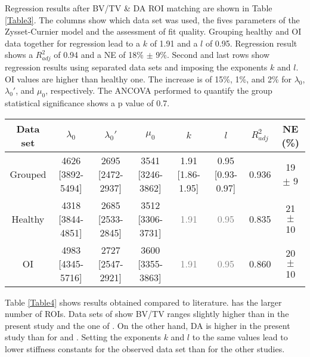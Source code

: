 \documentclass[a4paper,fleqn]{DC_ArtStyle}
\begin{document}
Regression results after BV/TV \& DA ROI matching are shown in Table \ref{Table3}. The columns show which data set was used, the fives parameters of the Zysset-Curnier model and the assessment of fit quality. Grouping healthy and OI data together for regression lead to a $k$ of 1.91 and a $l$ of 0.95. Regression result shows a $R^2_{adj}$ of 0.94 and a NE of 18\% $\pm$ 9\%. Second and last rows show regression results using separated data sets and imposing the exponents $k$ and $l$. OI values are higher than healthy one. The increase is of 15\%, 1\%, and 2\% for $\lambda_0$, $\lambda_0'$, and $\mu_0$, respectively. The ANCOVA performed to quantify the group statistical significance shows a p value of 0.7.\\

\begin{table*}[b]
	\caption{Constants obtained with BV/TV and DA matched data sets. Comparison is performed between grouped (N ROIs = 166) and separated data sets (N ROIs = 83). Values are presented as value [95\% CI] or mean $\pm$ standard deviation. Values in gray were imposed in the regression.}
	\label{Table3}
	\begin{tabular}{cccccccc}
		\toprule
		Data set & $\lambda_0$ & $\lambda_0'$ & $\mu_0$ & $k$ & $l$ & $R^2_{adj}$ & NE (\%) \\
		\midrule
		Grouped & 4626 [3892-5494] & 2695 [2472-2937] & 3541 [3246-3862] & 1.91 [1.86-1.95] & 0.95 [0.93-0.97] & 0.936 & 19 $\pm$ 9\\
		
		Healthy & 4318 [3844-4851] & 2685 [2533-2845] & 3512 [3306-3731] & \textcolor{gray}{1.91} & \textcolor{gray}{0.95} & 0.835 & 21 $\pm$ 10\\
		
		OI & 4983 [4345-5716] & 2727 [2547-2921] & 3600 [3355-3863] & \textcolor{gray}{1.91} & \textcolor{gray}{0.95} & 0.860 & 20 $\pm$ 10\\
		\bottomrule
	\end{tabular}
\end{table*}

Table \ref{Table4} shows results obtained compared to literature. \citeauthor{Gross2013} \cite{Gross2013} has the larger number of ROIs. Data sets of \citeauthor{Panyasantisuk2015} \cite{Panyasantisuk2015} show BV/TV ranges slightly higher than in the present study and the one of \citeauthor{Gross2013} \cite{Gross2013}. On the other hand, DA is higher in the present study than for \citeauthor{Panyasantisuk2015} \cite{Panyasantisuk2015} and \citeauthor{Gross2013} \cite{Gross2013}. Setting the exponents $k$ and $l$ to the same values lead to lower stiffness constants for the observed data set than for the other studies.\\
\end{document}
